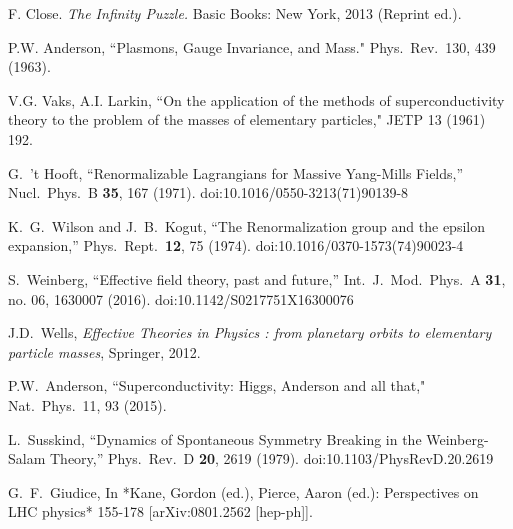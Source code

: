 \documentclass[letter,12pt]{article}
\begin{document}
\begin{thebibliography}{99}
  F. Close. {\it The Infinity Puzzle.} Basic Books: New York, 2013 (Reprint ed.).

  P.W. Anderson, 
  ``Plasmons, Gauge Invariance, and Mass."
  Phys.\ Rev.\ 130, 439 (1963).

 V.G. Vaks, A.I. Larkin, ``On the application of the methods of superconductivity theory to the problem of the masses of elementary particles,"  JETP 13 (1961) 192.
  
  G.~'t Hooft,
  ``Renormalizable Lagrangians for Massive Yang-Mills Fields,''
  Nucl.\ Phys.\ B {\bf 35}, 167 (1971).
  doi:10.1016/0550-3213(71)90139-8

  K.~G.~Wilson and J.~B.~Kogut,
  ``The Renormalization group and the epsilon expansion,''
  Phys.\ Rept.\  {\bf 12}, 75 (1974).
  doi:10.1016/0370-1573(74)90023-4
  

  S.~Weinberg,
  ``Effective field theory, past and future,''
  Int.\ J.\ Mod.\ Phys.\ A {\bf 31}, no. 06, 1630007 (2016).
  doi:10.1142/S0217751X16300076
  
J.D.~Wells, {\it Effective Theories in Physics : from planetary orbits to elementary particle masses}, Springer, 2012.

P.W.~Anderson, ``Superconductivity: Higgs, Anderson and all that,"
Nat.\ Phys.\ 11, 93 (2015).
 
  L.~Susskind,
  ``Dynamics of Spontaneous Symmetry Breaking in the Weinberg-Salam Theory,''
  Phys.\ Rev.\ D {\bf 20}, 2619 (1979).
  doi:10.1103/PhysRevD.20.2619
  
  G.~F.~Giudice,
  In *Kane, Gordon (ed.), Pierce, Aaron (ed.): Perspectives on LHC physics* 155-178
  [arXiv:0801.2562 [hep-ph]].
    

\end{thebibliography}
\end{document}
